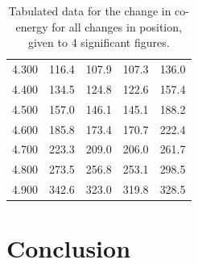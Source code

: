 \documentclass[a4paper]{IEEEtran}
\begin{document}
\begin{table}[]
\begin{tabular}{c|cccc}
            4.300 & 116.4 & 107.9 & 107.3 & 136.0 \\
            4.400 & 134.5 & 124.8 & 122.6 & 157.4 \\
            4.500 & 157.0 & 146.1 & 145.1 & 188.2 \\
            4.600 & 185.8 & 173.4 & 170.7 & 222.4 \\
            4.700 & 223.3 & 209.0 & 206.0 & 261.7 \\
            4.800 & 273.5 & 256.8 & 253.1 & 298.5 \\
            4.900 & 342.6 & 323.0 & 319.8 & 328.5
        \end{tabular}
        \caption{Tabulated data for the change in co-energy for all changes in position, given to 4 significant figures.}
        \label{coenergy}
    \end{table}


\section{Conclusion}


% 

% 
 
% 
\end{document}
